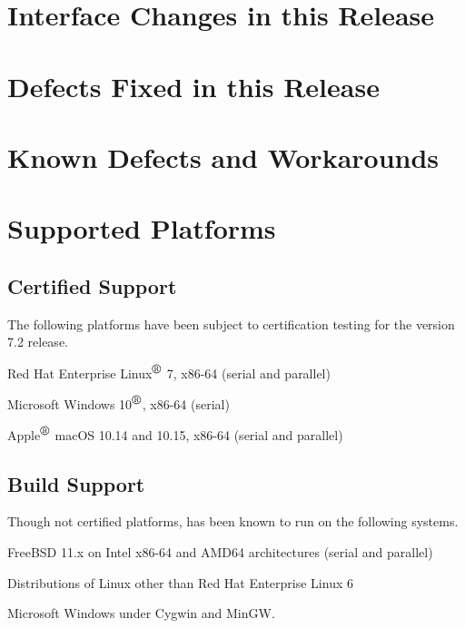 \documentclass[letterpaper]{scrartcl}
\begin{document}
\newpage
\section{Interface Changes in this Release}


\newpage
\section{Defects Fixed in this Release}


\newpage
\section{Known Defects and Workarounds}


\newpage
\section{Supported Platforms}
\subsection*{Certified Support}
The following platforms have been subject to certification testing for the
\Xyce{} version 7.2 release.
\begin{XyceItemize}
  \item Red Hat Enterprise Linux${}^{\mbox{\textregistered}}$ 7, x86-64 (serial and parallel)
  \item Microsoft Windows 10${}^{\mbox{\textregistered}}$, x86-64 (serial)
  \item Apple${}^{\mbox{\textregistered}}$ macOS 10.14 and 10.15, x86-64 (serial and parallel)
\end{XyceItemize}


\subsection*{Build Support}
Though not certified platforms, \Xyce{} has been known to run on the following
systems.
\begin{XyceItemize}
  \item FreeBSD 11.x on Intel x86-64 and AMD64 architectures (serial
    and parallel)
  \item Distributions of Linux other than Red Hat Enterprise Linux 6
  \item Microsoft Windows under Cygwin and MinGW.
\end{XyceItemize}
\end{document}
